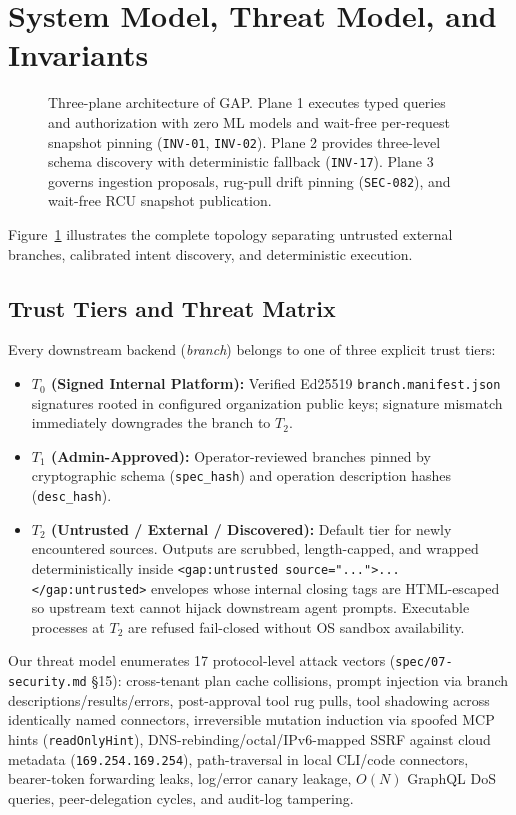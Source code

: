 \documentclass[10pt,twocolumn]{article}
\begin{document}
\section{System Model, Threat Model, and Invariants}
\label{sec:arch}

\begin{figure}[t]
  \centering
  
  \caption{Three-plane architecture of GAP. Plane 1 executes typed queries and authorization with zero ML models and wait-free per-request snapshot pinning (\texttt{INV-01}, \texttt{INV-02}). Plane 2 provides three-level schema discovery with deterministic fallback (\texttt{INV-17}). Plane 3 governs ingestion proposals, rug-pull drift pinning (\texttt{SEC-082}), and wait-free RCU snapshot publication.}
  \label{fig:arch}
\end{figure}

Figure~\ref{fig:arch} illustrates the complete topology separating untrusted external branches, calibrated intent discovery, and deterministic execution.

\subsection{Trust Tiers and Threat Matrix}
Every downstream backend (\emph{branch}) belongs to one of three explicit trust tiers:
\begin{itemize}
  \item \textbf{$T_0$ (Signed Internal Platform):} Verified Ed25519 \texttt{branch.manifest.json} signatures rooted in configured organization public keys; signature mismatch immediately downgrades the branch to $T_2$.
  \item \textbf{$T_1$ (Admin-Approved):} Operator-reviewed branches pinned by cryptographic schema (\texttt{spec\_hash}) and operation description hashes (\texttt{desc\_hash}).
  \item \textbf{$T_2$ (Untrusted / External / Discovered):} Default tier for newly encountered sources. Outputs are scrubbed, length-capped, and wrapped deterministically inside \texttt{<gap:untrusted source="...">...</gap:untrusted>} envelopes whose internal closing tags are HTML-escaped so upstream text cannot hijack downstream agent prompts. Executable processes at $T_2$ are refused fail-closed without OS sandbox availability.
\end{itemize}

Our threat model enumerates 17 protocol-level attack vectors (\texttt{spec/07-security.md} \S15): cross-tenant plan cache collisions, prompt injection via branch descriptions/results/errors, post-approval tool rug pulls, tool shadowing across identically named connectors, irreversible mutation induction via spoofed MCP hints (\texttt{readOnlyHint}), DNS-rebinding/octal/IPv6-mapped SSRF against cloud metadata (\texttt{169.254.169.254}), path-traversal in local CLI/code connectors, bearer-token forwarding leaks, log/error canary leakage, $O(N)$ GraphQL DoS queries, peer-delegation cycles, and audit-log tampering.
\end{document}
